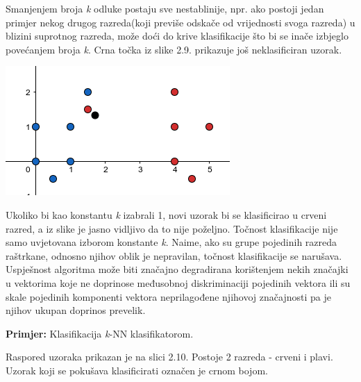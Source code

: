 \documentclass[times, utf8, zavrsni]{fer}
\begin{document}
\begin{multicols}{2}

Smanjenjem broja \textit{k} odluke postaju
sve nestablinije, npr. ako postoji jedan primjer nekog drugog 
razreda(koji previše odskače od vrijednosti svoga razreda) u blizini suprotnog razreda, 
može doći do krive klasifikacije što bi se inače izbjeglo povećanjem broja \textit{k}. 
Crna točka iz slike 2.9. prikazuje još neklasificiran uzorak. 

\begin{minipage}{\linewidth}
\vspace{10pt}
\centering
\includegraphics[width=0.8\linewidth]{img/krivo.png}
\end{minipage}

\end{multicols}

\bigbreak
Ukoliko bi kao konstantu \textit{k} izabrali 1, novi uzorak bi se klasificirao 
u crveni razred, a iz slike je jasno vidljivo da to nije poželjno. Točnost 
klasifikacije nije samo uvjetovana izborom konstante \textit{k}. Naime, 
ako su grupe pojedinih razreda raštrkane, odnosno njihov oblik je nepravilan,
točnost klasifikacije se narušava. Uspješnost algoritma može biti 
značajno degradirana korištenjem nekih značajki u vektorima koje ne 
doprinose međusobnoj diskriminaciji pojedinih vektora ili su skale pojedinih 
komponenti vektora neprilagođene njihovoj značajnosti pa je njihov ukupan doprinos prevelik. 

\bigbreak

\textbf{Primjer:}  Klasifikacija \textit{k}-NN klasifikatorom. 

Raspored uzoraka prikazan je na slici 2.10. Postoje 2 razreda - crveni i plavi. 
Uzorak koji se pokušava klasificirati označen je crnom bojom. 
\end{document}
